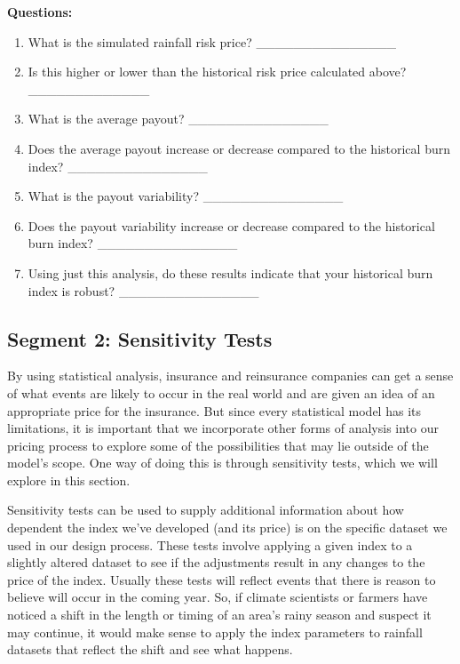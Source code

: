 \documentclass[letterpaper,10pt,english]{sphinxmanual}
\begin{document}
\textbf{Questions:}
\begin{enumerate}
\item {} 
What is the simulated rainfall risk price? \_\_\_\_\_\_\_\_\_\_\_\_\_\_\_

\item {} 
Is this higher or lower than the historical risk price calculated above? \_\_\_\_\_\_\_\_\_\_\_\_\_

\item {} 
What is the average payout? \_\_\_\_\_\_\_\_\_\_\_\_\_\_\_

\item {} 
Does the average payout increase or decrease compared to the historical burn index? \_\_\_\_\_\_\_\_\_\_\_\_\_\_\_

\item {} 
What is the payout variability? \_\_\_\_\_\_\_\_\_\_\_\_\_\_\_

\item {} 
Does the payout variability increase or decrease compared to the historical burn index? \_\_\_\_\_\_\_\_\_\_\_\_\_\_\_

\item {} 
Using just this analysis, do these results indicate that your historical burn index is robust? \_\_\_\_\_\_\_\_\_\_\_\_\_\_\_

\end{enumerate}


\subsection{Segment 2: Sensitivity Tests}
\label{wiiet/wiiet_initialtomarketpricing_Web:segment-2-sensitivity-tests}
By using statistical analysis, insurance and reinsurance companies can get a sense of what events are likely to occur in the real world and are given an idea of an appropriate price for the insurance. But since every statistical model has its limitations, it is important that we incorporate other forms of analysis into our pricing process to explore some of the possibilities that may lie outside of the model's scope. One way of doing this is through sensitivity tests, which we will explore in this section.

Sensitivity tests can be used to supply additional information about how dependent the index we've developed (and its price) is on the specific dataset we used in our design process. These tests involve applying a given index to a slightly altered dataset to see if the adjustments result in any changes to the price of the index. Usually these tests will reflect events that there is reason to believe will occur in the coming year. So, if climate scientists or farmers have noticed a shift in the length or timing of an area's rainy season and suspect it may continue, it would make sense to apply the index parameters to rainfall datasets that reflect the shift and see what happens.
\end{document}
